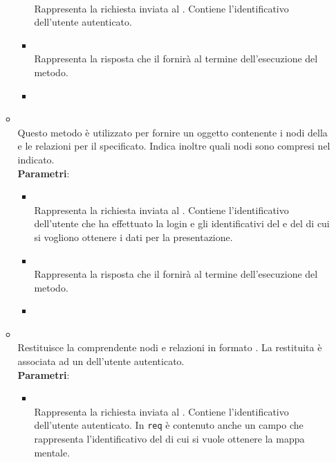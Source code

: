 \begin{itemize}
\begin{itemize}
\begin{itemize}
\\ Rappresenta la richiesta inviata al . Contiene l’identificativo dell’utente autenticato.
\item {}
\\ Rappresenta la risposta che il  fornirà al termine dell’esecuzione del metodo.
\item {}
\\ \dpNext
\end{itemize}
\item {}
\\ Questo metodo è utilizzato per fornire un oggetto  contenente i nodi della  e le relazioni per il  specificato. Indica inoltre quali nodi sono compresi nel  indicato.
\\ \textbf{Parametri}:
\begin{itemize}
\item {}
\\ Rappresenta la richiesta inviata al . Contiene l’identificativo dell’utente che ha effettuato la login e gli identificativi del  e del  di cui si vogliono ottenere i dati per la presentazione.
\item {}
\\ Rappresenta la risposta che il  fornirà al termine dell’esecuzione del metodo.
\item {}
\\ \dpNext
\end{itemize}
\item {}
\\ Restituisce la  comprendente nodi e relazioni in formato . La  restituita è associata ad un  dell’utente autenticato.
\\ \textbf{Parametri}:
\begin{itemize}
\item {}
\\ Rappresenta la richiesta inviata al . Contiene l’identificativo dell’utente autenticato. In \texttt{req} è contenuto anche un campo che rappresenta l’identificativo del  di cui si vuole ottenere la mappa mentale.

\end{itemize}
\end{itemize}
\end{itemize}
